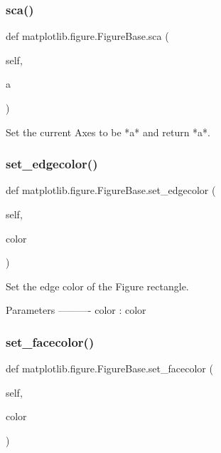 \begin{DoxyVerb}
\begin{DoxyVerb}
\subsubsection{\texorpdfstring{sca()}{sca()}}
{\footnotesize\ttfamily def matplotlib.\+figure.\+Figure\+Base.\+sca (\begin{DoxyParamCaption}\item[{}]{self,  }\item[{}]{a }\end{DoxyParamCaption})}

\begin{DoxyVerb}Set the current Axes to be *a* and return *a*.\end{DoxyVerb}
 \mbox{\label{classmatplotlib_1_1figure_1_1FigureBase_ae3426fdd53b19510faeb21c959547346}} 
\subsubsection{\texorpdfstring{set\+\_\+edgecolor()}{set\_edgecolor()}}
{\footnotesize\ttfamily def matplotlib.\+figure.\+Figure\+Base.\+set\+\_\+edgecolor (\begin{DoxyParamCaption}\item[{}]{self,  }\item[{}]{color }\end{DoxyParamCaption})}

\begin{DoxyVerb}Set the edge color of the Figure rectangle.

Parameters
----------
color : color
\end{DoxyVerb}
 \mbox{\label{classmatplotlib_1_1figure_1_1FigureBase_a58d611bed2cfe9f566f169e96ecece8f}} 
\subsubsection{\texorpdfstring{set\+\_\+facecolor()}{set\_facecolor()}}
{\footnotesize\ttfamily def matplotlib.\+figure.\+Figure\+Base.\+set\+\_\+facecolor (\begin{DoxyParamCaption}\item[{}]{self,  }\item[{}]{color }\end{DoxyParamCaption})}


\end{DoxyVerb}
\end{DoxyVerb}
